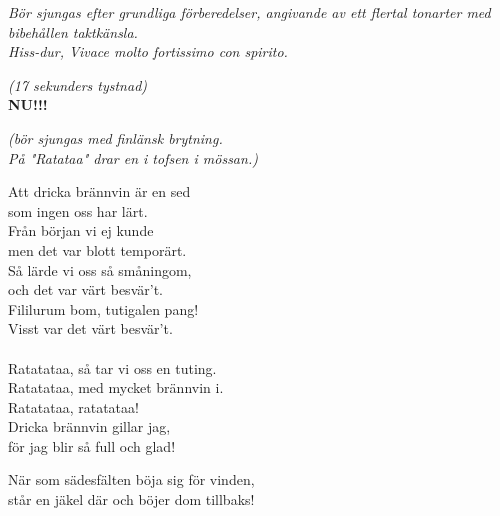 \documentclass[a6paper, 10pt, twoside]{article}
\begin{document}
\noindent
\begin{center}
    \textit{\small Bör sjungas efter grundliga förberedelser, angivande av ett flertal tonarter med bibehållen taktkänsla.\\ Hiss-dur, Vivace molto fortissimo con spirito.\\}
    \begin{lyrics}
        \textit{\small(17 sekunders tystnad)}\\
        \Large \textbf{NU!!!}
    \end{lyrics}
\end{center}
\begin{center}
    \textit{\small (bör sjungas med finlänsk brytning. \\ På "Ratataa" drar en i tofsen i mössan.)}
\end{center}
\begin{lyrics}
Att dricka brännvin är en sed \\
som ingen oss har lärt. \\
Från början vi ej kunde \\
men det var blott temporärt. \\
Så lärde vi oss så småningom, \\
och det var värt besvär't. \\
Fililurum bom, tutigalen pang! \\
Visst var det värt besvär't. \\
\vspace{5pt}\\
Ratatataa, så tar vi oss en tuting. \\
Ratatataa, med mycket brännvin i. \\
Ratatataa, ratatataa! \\
Dricka brännvin gillar jag, \\
för jag blir så full och glad! 
\end{lyrics}
\begin{center}
\end{center}
\begin{lyrics}
När som sädesfälten böja sig för vinden, \\
står en jäkel där och böjer dom tillbaks! 
\end{lyrics}
\end{document}
